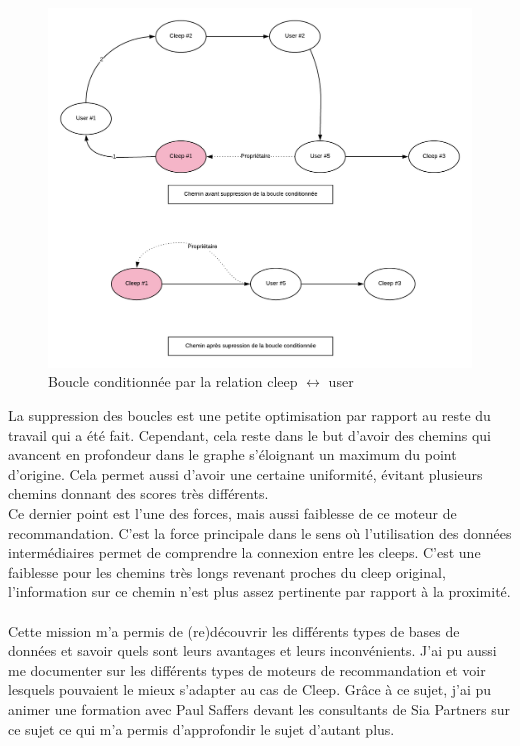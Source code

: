 \documentclass{article} %
\begin{document}
{\begin{figure}[!h]
 \centering
 \includegraphics[keepaspectratio = true,scale=0.6]{bbb}
 \caption{Boucle conditionnée par la relation cleep $\leftrightarrow$ user}
 \label{fig:bbb}
\end{figure}

La suppression des boucles est une petite optimisation par rapport au reste du travail qui a été fait. Cependant, cela reste dans le but d'avoir des chemins qui avancent en profondeur dans le graphe s'éloignant un maximum du point d'origine. Cela permet aussi d'avoir une certaine uniformité, évitant plusieurs chemins donnant des scores très différents.\\
Ce dernier point est l'une des forces, mais aussi faiblesse de ce moteur de recommandation. C'est la force principale dans le sens où l'utilisation des données intermédiaires permet de comprendre la connexion entre les cleeps. C'est une faiblesse pour les chemins très longs revenant proches du cleep original, l'information sur ce chemin n'est plus assez pertinente par rapport à la proximité.\\ \\

Cette mission m'a permis de (re)découvrir les différents types de bases de données et savoir quels sont leurs avantages et leurs inconvénients. J'ai pu aussi me documenter sur les différents types de moteurs de recommandation et voir lesquels pouvaient le mieux s'adapter au cas de Cleep. Grâce à ce sujet, j'ai pu animer une formation avec Paul Saffers devant les consultants de Sia Partners sur ce sujet ce qui m'a permis d'approfondir le sujet d'autant plus. 

}
\end{document}
